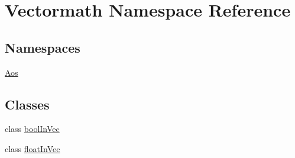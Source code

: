 \hypertarget{namespaceVectormath}{\section{Vectormath Namespace Reference}
\label{namespaceVectormath}
}
\subsection*{Namespaces}
\begin{DoxyCompactItemize}
\item 
\hyperlink{namespaceVectormath_1_1Aos}{Aos}
\end{DoxyCompactItemize}
\subsection*{Classes}
\begin{DoxyCompactItemize}
\item 
class \hyperlink{classVectormath_1_1boolInVec}{bool\-In\-Vec}
\item 
class \hyperlink{classVectormath_1_1floatInVec}{float\-In\-Vec}
\end{DoxyCompactItemize}
